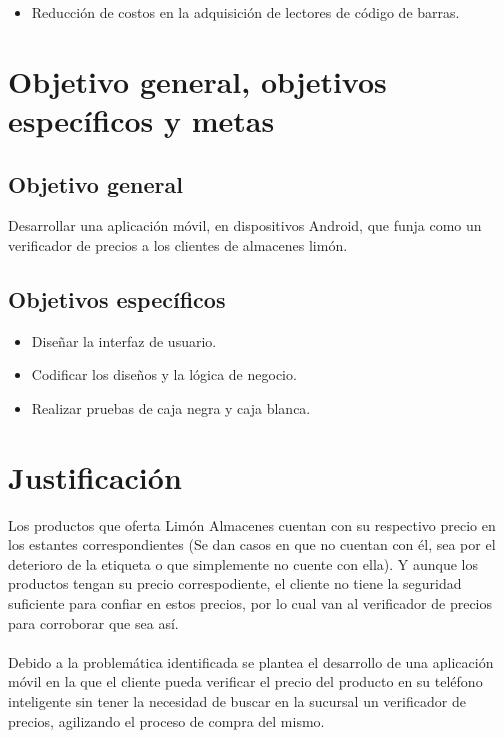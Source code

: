 \begin{itemize}
	\item Reducción de costos en la adquisición de lectores de código de barras.
\end{itemize}

\section{Objetivo general, objetivos específicos y metas}
\subsection{Objetivo general}
Desarrollar una aplicación móvil, en dispositivos Android, que funja como un verificador de precios a los clientes de almacenes limón.
\subsection{Objetivos específicos}
\begin{itemize}
	\item Diseñar la interfaz de usuario.
	\item Codificar los diseños y la lógica de negocio.
	\item Realizar pruebas de caja negra y caja blanca.
\end{itemize}

\section{Justificación}
Los productos que oferta Limón Almacenes cuentan con su respectivo precio en los estantes correspondientes (Se dan casos en que no cuentan con él, sea por el deterioro de la etiqueta o que simplemente no cuente con ella). Y aunque los productos tengan su precio correspodiente, el cliente no tiene la seguridad suficiente para confiar en estos precios, por lo cual van al verificador de precios para corroborar que sea así.
\\
\\
Debido a la problemática identificada se plantea el desarrollo de una aplicación móvil en la que el cliente pueda verificar el precio del producto en su teléfono inteligente sin tener la necesidad de buscar en la sucursal un verificador de precios, agilizando el proceso de compra del mismo.